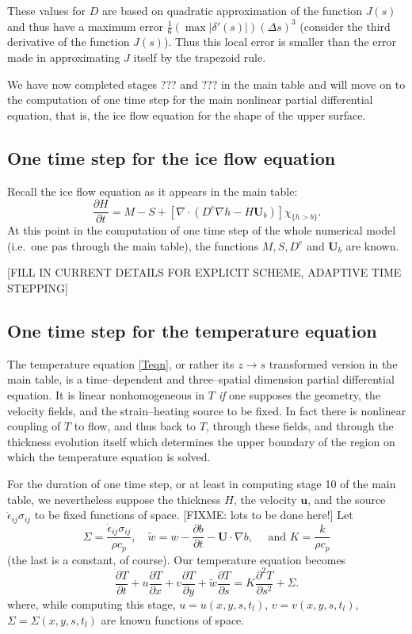\documentclass[12pt,final]{amsart}%
\theoremstyle{plain}
\theoremstyle{definition}
\theoremstyle{remark}
\newcommand{\ddt}[1]{\ensuremath{\frac{\partial #1}{\partial t}}}
\newcommand{\ddx}[1]{\ensuremath{\frac{\partial #1}{\partial x}}}
\newcommand{\ddy}[1]{\ensuremath{\frac{\partial #1}{\partial y}}}
\newcommand{\dds}[1]{\ensuremath{\frac{\partial #1}{\partial s}}}
\newcommand{\dddsds}[1]{\ensuremath{\frac{\partial^2 #1}{\partial s^2}}}
\newcommand{\diverg}{\nabla\cdot}
\def\eps{\epsilon}
\newcommand{\grad}{\nabla}
\newcommand{\bu}{{\mathbf{u}}}
\newcommand{\bU}{{\mathbf{U}}}
\begin{document}
These values for $D$ are based on quadratic approximation of the function $J(s)$ and thus have a maximum error $\frac{1}{6} \left(\max |\delta'(s)|\right) (\Delta s)^3$ (consider the third derivative of the function $J(s)$).  Thus this local error is smaller than the error made in approximating $J$ itself by the trapezoid rule.

We have now completed stages ??? and ??? in the main table and will move on to the computation of one time step for the main nonlinear partial differential equation, that is, the ice flow equation for the shape of the upper surface.

\subsection*{One time step for the ice flow equation}  Recall the ice flow equation as it appears in the main table:
\begin{equation}\label{iceagain}
\ddt{H}= M - S + \left[\diverg \left(D^e \grad h - H\bU_b\right)\right]\chi_{\{h>b\}}.\end{equation}
At this point in the computation of one time step of the whole numerical model (i.e.~one pas through the main table), the functions $M,S,D^e$ and $\bU_b$ are known.

[FILL IN CURRENT DETAILS FOR EXPLICIT SCHEME, ADAPTIVE TIME STEPPING]

\subsection*{One time step for the temperature equation}  The temperature equation \eqref{Teqn}, or rather its $z\to s$ transformed version in the main table, is a time--dependent and three--spatial dimension partial differential equation.  It is linear nonhomogeneous in $T$ \emph{if} one supposes the geometry, the velocity fields, and the strain--heating source to be fixed.  In fact there is nonlinear coupling of $T$ to flow, and thus back to $T$, through these fields, and through the thickness evolution itself which determines the upper boundary of the region on which the temperature equation is solved.

For the duration of one time step, or at least in computing stage 10 of the main table, we nevertheless suppose the thickness $H$, the velocity $\bu$, and the source $\dot\eps_{ij}\sigma_{ij}$ to be fixed functions of space.  [FIXME: lots to be done here!]  Let
    $$\Sigma = \frac{\dot\eps_{ij}\sigma_{ij}}{\rho c_p}, \quad \tilde w=w-\ddt{b}-\bU\cdot \grad b, \quad \text{ and } K=\frac{k}{\rho c_p}$$
(the last is a constant, of course).  Our temperature equation becomes
\begin{equation}\label{simpTemp}
\ddt{T}+u\ddx{T}+v\ddy{T}+\tilde w \dds{T} = K \dddsds{T}+\Sigma.
\end{equation}
where, while computing this stage, $u=u(x,y,s,t_l)$, $v=v(x,y,s,t_l)$, $\Sigma=\Sigma(x,y,s,t_l)$ are known functions of space.
\end{document}
